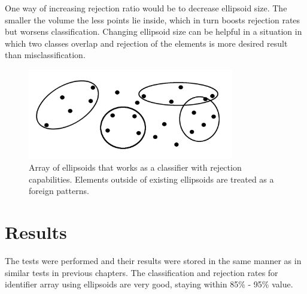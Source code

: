 One way of increasing rejection ratio would be to decrease ellipsoid size. The smaller the volume the less points lie inside, which in turn boosts rejection rates but worsens classification. Changing ellipsoid size can be helpful in a situation in which two classes overlap and rejection of the elements is more desired result than misclassification.

\begin{figure}[htp]
	\centering
	\includegraphics[width=0.8\textwidth]{Figures/ellipsoids_array_example.png}
	\caption{ Array of ellipsoids that works as a classifier with rejection capabilities. Elements outside of existing ellipsoids are treated as a foreign patterns. }
	\label{fig:ellipsoids_array}\vspace{-3pt}
\end{figure}


\section{Results}

The tests were performed and their results were stored in the same manner as in similar tests in previous chapters. The classification and rejection rates for identifier array using ellipsoids are very good, staying within 85\% - 95\% value.

